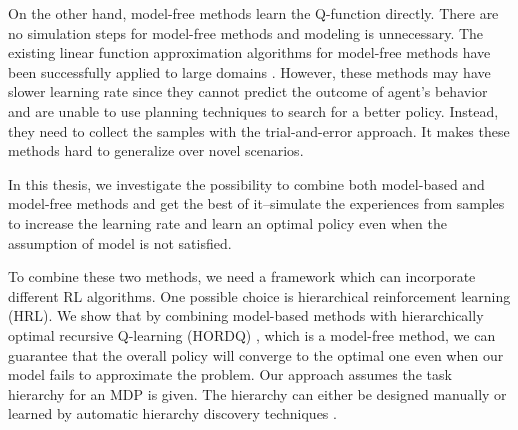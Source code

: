 On the other hand, model-free methods learn the Q-function directly. 
There are no simulation steps for model-free methods and modeling is unnecessary. 
The existing linear function approximation algorithms for model-free methods have been successfully 
applied to large domains \cite{LSTD99, KeepAway}. 
However, these methods may have slower learning rate since they cannot predict
the outcome of agent's behavior and are unable to use planning techniques to 
search for a better policy. Instead, they need to collect the samples with the trial-and-error 
approach. It makes these methods hard to generalize over novel scenarios.



In this thesis, we investigate the possibility to combine both model-based and model-free methods 
and get the best of it--simulate the experiences from samples to increase the learning rate
and learn an optimal policy even when the assumption of model is not satisfied. 

To combine these two methods, we need a framework which can incorporate different RL algorithms.
One possible choice is hierarchical reinforcement learning (HRL). 
We show that by combining model-based methods with 
hierarchically optimal recursive Q-learning (HORDQ) \cite{HORDQ}, which is a model-free method, we can 
guarantee that the overall policy will converge to the optimal one even when our model
fails to approximate the problem. 
Our approach assumes the task hierarchy for an MDP is given. The hierarchy can either be 
designed manually or learned by automatic hierarchy discovery techniques \cite{HexQ}.


